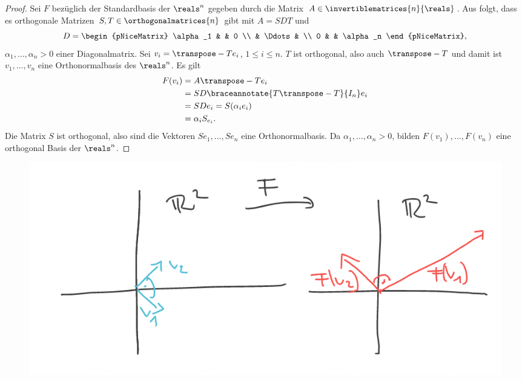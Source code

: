 \begin{proof}
  Sei \( F \) bezüglich der Standardbasis der \( \reals^n \) gegeben durch die Matrix \( A\in \invertiblematrices{n}{\reals} \). Aus  folgt, dass es orthogonale Matrizen \( S,T\in \orthogonalmatrices{n} \) gibt mit \( A=SDT \) und
  \begin{equation*}
    D=\begin{pNiceMatrix}
      \alpha_1 &  & 0 \\
       & \Ddots &  \\
      0 &  & \alpha_n
    \end{pNiceMatrix},
  \end{equation*}
  \( \alpha_1,\dotsc,\alpha_n>0 \) einer Diagonalmatrix. Sei \( v_i=\transpose-{T}e_i \), \( 1\leq i\leq n \). \( T \) ist orthogonal, also auch \( \transpose-{T} \) und damit ist \( v_1,\dotsc,v_n \) eine Orthonormalbasis des \( \reals^n \). Es gilt
  \begin{align*}
    F(v_i)&=A\transpose-{T}e_i\\
    &=SD\braceannotate{T\transpose-{T}}{I_n}e_i\\
    &=SDe_i=S(\alpha_i e_i)\\
    &=\alpha_i S_{e_i}.
  \end{align*}
  Die Matrix \( S \) ist orthogonal, also sind die Vektoren \( Se_1,\dotsc,Se_n \) eine Orthonormalbasis. Da \( \alpha_1,\dotsc,\alpha_n>0 \), bilden \( F(v_1),\dotsc,F(v_n) \) eine orthogonal Basis der \( \reals^n \).
\end{proof}
\begin{beispiel*}
  \phantom{Ein Beispiel}
  \begin{figure}[H]
    \centering
    \includegraphics[width=0.5\linewidth]{figures/orthonormalbasis_auf_orthogonalbasis}
    \label{fig:orthonormalbasis_auf_orthogonalbasis}
  \end{figure}
\end{beispiel*}